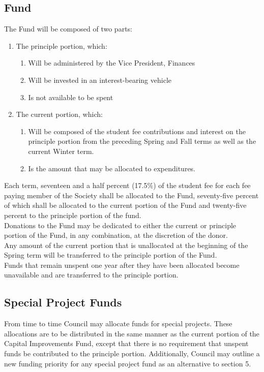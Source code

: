 \subsection{Fund}
The Fund will be composed of two parts:
\begin{enumerate}
\item The principle portion, which:
	\begin{enumerate}
	\item Will be administered by the Vice President, Finances
	\item Will be invested in an interest-bearing vehicle
	\item Is not available to be spent 
	\end{enumerate}
\item The current portion, which:
	\begin{enumerate}
	\item Will be composed of the student fee contributions and interest on the principle portion from the preceding Spring and Fall terms as well as the current Winter term. 
	\item Is the amount that may be allocated to expenditures. 
	\end{enumerate}
\end{enumerate}
Each term, seventeen and a half percent (17.5\%) of the student fee for each fee paying member of the Society shall be allocated to the Fund, seventy-five percent of which shall be allocated to the current portion of the Fund and twenty-five percent to the principle portion of the fund.\\
Donations to the Fund may be dedicated to either the current or principle portion of the Fund, in any combination, at the discretion of the donor.\\
Any amount of the current portion that is unallocated at the beginning of the Spring term will be transferred to the principle portion of the Fund.\\
Funds that remain unspent one year after they have been allocated become unavailable and are transferred to the principle portion.\\

\subsection{Special Project Funds}
From time to time Council may allocate funds for special projects. These allocations are to be distributed in the same manner as the current portion of the Capital Improvements Fund, except that there is no requirement that unspent funds be contributed to the principle portion.
Additionally, Council may outline a new funding priority for any special project fund as an alternative to section 5.

